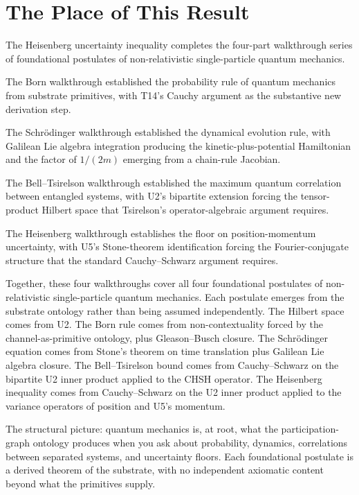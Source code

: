 \documentclass[11pt,a4paper]{article}
\begin{document}
\section{The Place of This Result}

The Heisenberg uncertainty inequality completes the four-part walkthrough series of foundational postulates of non-relativistic single-particle quantum mechanics.

The Born walkthrough established the probability rule of quantum mechanics from substrate primitives, with T14's Cauchy argument as the substantive new derivation step.

The Schr\"odinger walkthrough established the dynamical evolution rule, with Galilean Lie algebra integration producing the kinetic-plus-potential Hamiltonian and the factor of $1/(2m)$ emerging from a chain-rule Jacobian.

The Bell--Tsirelson walkthrough established the maximum quantum correlation between entangled systems, with U2's bipartite extension forcing the tensor-product Hilbert space that Tsirelson's operator-algebraic argument requires.

The Heisenberg walkthrough establishes the floor on position-momentum uncertainty, with U5's Stone-theorem identification forcing the Fourier-conjugate structure that the standard Cauchy--Schwarz argument requires.

Together, these four walkthroughs cover all four foundational postulates of non-relativistic single-particle quantum mechanics. Each postulate emerges from the substrate ontology rather than being assumed independently. The Hilbert space comes from U2. The Born rule comes from non-contextuality forced by the channel-as-primitive ontology, plus Gleason--Busch closure. The Schr\"odinger equation comes from Stone's theorem on time translation plus Galilean Lie algebra closure. The Bell--Tsirelson bound comes from Cauchy--Schwarz on the bipartite U2 inner product applied to the CHSH operator. The Heisenberg inequality comes from Cauchy--Schwarz on the U2 inner product applied to the variance operators of position and U5's momentum.

The structural picture: quantum mechanics is, at root, what the participation-graph ontology produces when you ask about probability, dynamics, correlations between separated systems, and uncertainty floors. Each foundational postulate is a derived theorem of the substrate, with no independent axiomatic content beyond what the primitives supply.
\end{document}

